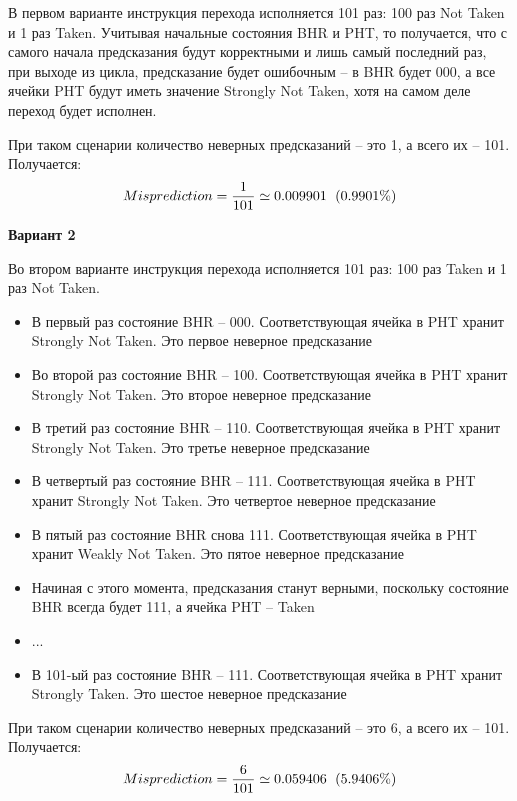 	В первом варианте инструкция перехода исполняется 101 раз: 100 раз Not Taken и 1 раз Taken. Учитывая начальные состояния BHR и PHT, то получается, что с самого начала предсказания будут корректными и лишь самый последний раз, при выходе из цикла, предсказание будет ошибочным -- в BHR будет 000, а все ячейки PHT будут иметь значение Strongly Not Taken, хотя на самом деле переход будет исполнен.
	
	При таком сценарии количество неверных предсказаний -- это 1, а всего их -- 101. Получается:
	\begin{equation*}
		Misprediction = \frac{1}{101} \simeq 0.009901 \hspace*{6pt} (0.9901 \%)
	\end{equation*}

	\newpage
	\textbf{Вариант 2}

	Во втором варианте инструкция перехода исполняется 101 раз: 100 раз Taken и 1 раз Not Taken.
	\begin{itemize}
		\item В первый раз состояние BHR -- 000. Соответствующая ячейка в PHT хранит Strongly Not Taken. Это первое неверное предсказание
		\item Во второй раз состояние BHR -- 100. Соответствующая ячейка в PHT хранит Strongly Not Taken. Это второе неверное предсказание		\item В третий раз состояние BHR -- 110. Соответствующая ячейка в PHT хранит Strongly Not Taken. Это третье неверное предсказание		\item В четвертый раз состояние BHR -- 111. Соответствующая ячейка в PHT хранит Strongly Not Taken. Это четвертое неверное предсказание
		\item В пятый раз состояние BHR снова 111. Соответствующая ячейка в PHT хранит Weakly Not Taken. Это пятое неверное предсказание
		\item Начиная с этого момента, предсказания станут верными, поскольку состояние BHR всегда будет 111, а ячейка PHT -- Taken
		\item ...
		\item В 101-ый раз состояние BHR -- 111. Соответствующая ячейка в PHT хранит Strongly Taken. Это шестое неверное предсказание
	\end{itemize}

	При таком сценарии количество неверных предсказаний -- это 6, а всего их -- 101. Получается:
	\begin{equation*}
		Misprediction = \frac{6}{101} \simeq 0.059406 \hspace*{6pt} (5.9406 \%)
	\end{equation*}
	
